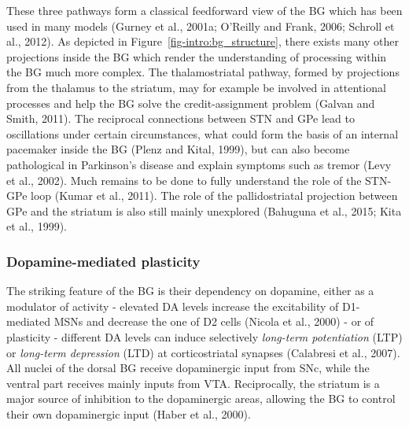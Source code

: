 \documentclass[
  11pt,
  a4paper,
]{scrbook}
\begin{document}
These three pathways form a classical feedforward view of the BG which
has been used in many models (Gurney et al., 2001a; O'Reilly and Frank,
2006; Schroll et al., 2012). As depicted in
Figure~\ref{fig-intro:bg_structure}, there exists many other projections
inside the BG which render the understanding of processing within the BG
much more complex. The thalamostriatal pathway, formed by projections
from the thalamus to the striatum, may for example be involved in
attentional processes and help the BG solve the credit-assignment
problem (Galvan and Smith, 2011). The reciprocal connections between STN
and GPe lead to oscillations under certain circumstances, what could
form the basis of an internal pacemaker inside the BG (Plenz and Kital,
1999), but can also become pathological in Parkinson's disease and
explain symptoms such as tremor (Levy et al., 2002). Much remains to be
done to fully understand the role of the STN-GPe loop (Kumar et al.,
2011). The role of the pallidostriatal projection between GPe and the
striatum is also still mainly unexplored (Bahuguna et al., 2015; Kita et
al., 1999).

\subsubsection*{Dopamine-mediated
plasticity}\label{dopamine-mediated-plasticity}

The striking feature of the BG is their dependency on dopamine, either
as a modulator of activity - elevated DA levels increase the
excitability of D1-mediated MSNs and decrease the one of D2 cells
(Nicola et al., 2000) - or of plasticity - different DA levels can
induce selectively \emph{long-term potentiation} (LTP) or
\emph{long-term depression} (LTD) at corticostriatal synapses (Calabresi
et al., 2007). All nuclei of the dorsal BG receive dopaminergic input
from SNc, while the ventral part receives mainly inputs from VTA.
Reciprocally, the striatum is a major source of inhibition to the
dopaminergic areas, allowing the BG to control their own dopaminergic
input (Haber et al., 2000).
\end{document}
